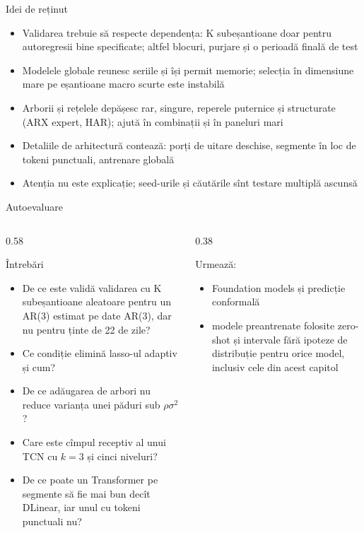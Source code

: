 \begin{frame}{Idei de reținut}
\itemsize{\small}
\begin{itemize}
    \item Validarea trebuie să respecte dependența: K subeșantioane doar pentru autoregresii bine specificate; altfel blocuri, purjare și o perioadă finală de test
    \item Modelele globale reunesc seriile și își permit memorie; selecția în dimensiune mare pe eșantioane macro scurte este instabilă
    \item Arborii și rețelele depășesc rar, singure, reperele puternice și structurate (ARX expert, HAR); ajută în combinații și în paneluri mari
    \item Detaliile de arhitectură contează: porți de uitare deschise, segmente în loc de tokeni punctuali, antrenare globală
    \item Atenția nu este explicație; seed-urile și căutările sînt testare multiplă ascunsă
\end{itemize}
\end{frame}

\begin{frame}{Autoevaluare}
\itemsize{\small}
\begin{columns}[T]
\begin{column}{0.58\textwidth}
\begin{block}{Întrebări}
\begin{itemize}
    \item De ce este validă validarea cu K subeșantioane aleatoare pentru un AR(3) estimat pe date AR(3), dar nu pentru ținte de 22 de zile?
    \item Ce condiție elimină lasso-ul adaptiv și cum?
    \item De ce adăugarea de arbori nu reduce varianța unei păduri sub $\rho\sigma^2$?
    \item Care este cîmpul receptiv al unui TCN cu $k = 3$ și cinci niveluri?
    \item De ce poate un Transformer pe segmente să fie mai bun decît DLinear, iar unul cu tokeni punctuali nu?
\end{itemize}
\end{block}
\end{column}
\begin{column}{0.38\textwidth}
\begin{block}{Urmează: }
\begin{itemize}
    \item Foundation models și predicție conformală
    \item modele preantrenate folosite zero-shot și intervale fără ipoteze de distribuție pentru orice model, inclusiv cele din acest capitol
\end{itemize}
\end{block}
\end{column}
\end{columns}
\end{frame}


